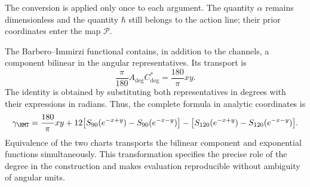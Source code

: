 The conversion is applied only once to each argument. The quantity \(\alpha\) remains dimensionless and the quantity \(\hbar\) still belongs to the action line; their prior coordinates enter the map \(\mathcal P\).

The Barbero--Immirzi functional contains, in addition to the channels, a component bilinear in the angular representatives. Its transport is
\begin{equation}
 \frac{\pi}{180}A_{\deg}C^*_{\deg}
 =\frac{180}{\pi}xy.
 \label{ii:eq:ii-barbero-cartas}
\end{equation}
The identity is obtained by substituting both representatives in degrees with their expressions in radians. Thus, the complete formula in analytic coordinates is
\[
 \gamma_{\HMT}
 =\frac{180}{\pi}xy
 +12\bigl[S_{90}(e^{-x+y})-S_{90}(e^{-x-y})\bigr]
 -\bigl[S_{120}(e^{-x+y})-S_{120}(e^{-x-y})\bigr].
\]
Equivalence of the two charts transports the bilinear component and exponential functions simultaneously. This transformation specifies the precise role of the degree in the construction and makes evaluation reproducible without ambiguity of angular units.
